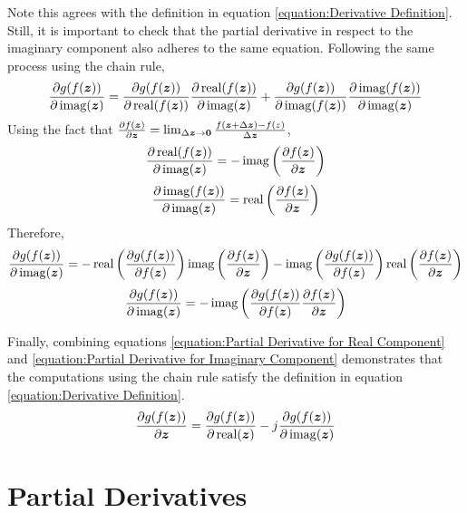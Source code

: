 \begin{appendices}
Note this agrees with the definition in equation \ref{equation:Derivative Definition}. Still, it is important to check that the partial derivative in respect to the imaginary component also adheres to the same equation. Following the same process using the chain rule,
\begin{equation}
\frac{\partial g(f(\bm{z}))}{\partial \operatorname{imag}(\bm{z})} = \frac{\partial g(f(\bm{z}))}{\partial \operatorname{real}(f(\bm{z}))}\frac{\partial \operatorname{real}(f(\bm{z}))}{\partial \operatorname{imag}(\bm{z})} + \frac{\partial g(f(\bm{z}))}{\partial \operatorname{imag}(f(\bm{z}))}\frac{\partial \operatorname{imag}(f(\bm{z}))}{\partial \operatorname{imag}(\bm{z})}
\end{equation}
Using the fact that $\frac{\partial f(\bm{z})}{\partial \bm{z}} = \lim_{\Delta \bm{z} \rightarrow \bm{0}} \frac{f(\bm{z} + \Delta \bm{z}) - f(z)}{\Delta \bm{z}}$,
\begin{equation}
\frac{\partial \operatorname{real}(f(\bm{z}))}{\partial \operatorname{imag}(\bm{z})} = -\operatorname{imag}\left(\frac{\partial f(\bm{z})}{\partial \bm{z}}\right)
\end{equation}
\begin{equation}
\frac{\partial \operatorname{imag}(f(\bm{z}))}{\partial \operatorname{imag}(\bm{z})} = \operatorname{real}\left(\frac{\partial f(\bm{z})}{\partial \bm{z}}\right)
\end{equation}
Therefore,
\begin{equation}
\frac{\partial g(f(\bm{z}))}{\partial \operatorname{imag}(\bm{z})} = -\operatorname{real}\left(\frac{\partial g(f(\bm{z}))}{\partial f(\bm{z})}\right)\operatorname{imag}\left(\frac{\partial f(\bm{z})}{\partial \bm{z}}\right) - \operatorname{imag}\left(\frac{\partial g(f(\bm{z}))}{\partial f(\bm{z})}\right)\operatorname{real}\left(\frac{\partial f(\bm{z})}{\partial \bm{z}}\right)
\end{equation}
\begin{equation} \label{equation:Partial Derivative for Imaginary Component}
\frac{\partial g(f(\bm{z}))}{\partial \operatorname{imag}(\bm{z})} = -\operatorname{imag}\left(\frac{\partial g(f(\bm{z}))}{\partial f(\bm{z})}\frac{\partial f(\bm{z})}{\partial \bm{z}}\right)
\end{equation}

Finally, combining equations \ref{equation:Partial Derivative for Real Component} and \ref{equation:Partial Derivative for Imaginary Component} demonstrates that the computations using the chain rule satisfy the definition in equation \ref{equation:Derivative Definition}.
\begin{equation}
\frac{\partial g(f(\bm{z}))}{\partial \bm{z}} = \frac{\partial g(f(\bm{z}))}{\partial \operatorname{real}(\bm{z})} - j\frac{\partial g(f(\bm{z}))}{\partial \operatorname{imag}(\bm{z})}
\end{equation}

\section{Partial Derivatives}


\end{appendices}
